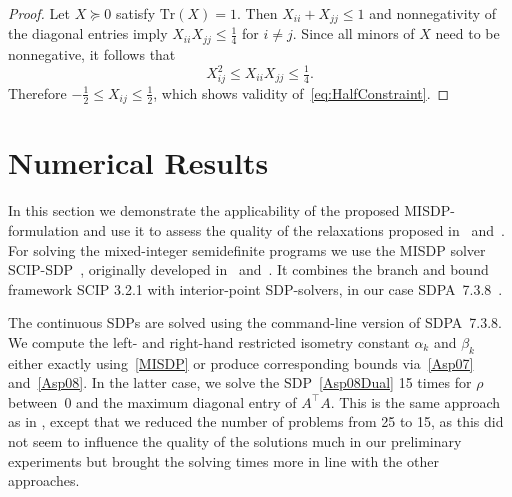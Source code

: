 \documentclass[journal]{IEEEtran}
\newcommand{\T}{^{\top}}
\newcommand{\Tr}{\text{Tr}}
\begin{document}
\begin{proof}
  Let $X \succeq 0$ satisfy $\Tr(X)=1$. Then $X_{ii}+X_{jj}\leq 1$ and
  nonnegativity of the diagonal entries imply $X_{ii}X_{jj}\leq
  \tfrac{1}{4}$ for $i \neq j$. Since all minors of $X$ need to be nonnegative, it
  follows that
  \begin{equation*}
    X_{ij}^2 \leq  X_{ii} X_{jj} \leq \tfrac{1}{4}.
  \end{equation*}
  Therefore $- \tfrac{1}{2} \leq X_{ij} \leq \tfrac{1}{2}$, which shows
  validity of~\eqref{eq:HalfConstraint}.
\end{proof}


\section{Numerical Results}
\label{sec:numerical_results}

\noindent
In this section we demonstrate the applicability of the proposed MISDP-formulation and use it to
assess the quality of the relaxations proposed in~\cite{Asp08} and~\cite{Asp07}.
For solving the mixed-integer semidefinite programs we use the MISDP solver SCIP-SDP~\cite{SCIP-SDP},
originally developed in~\cite{Mar13} and~\cite{MS12}. It combines the
branch and bound framework SCIP 3.2.1 \cite{SCIP} with 
interior-point SDP-solvers, in our case SDPA~7.3.8~\cite{SDPA6,SDPA7}.

The continuous SDPs are solved using the command-line version of
SDPA~7.3.8. We compute the left- and right-hand restricted isometry
constant $\alpha_k$ and $\beta_k$ either exactly using~\eqref{MISDP} or
produce corresponding bounds via~\eqref{Asp07} and~\eqref{Asp08}. In
the latter case, we solve the SDP~\eqref{Asp08Dual} 15 times for $\rho$ between~$0$ and the maximum
diagonal entry of $A\T A$. This is the same approach as in \cite{Asp08},
except that we reduced the number of problems from 25 to 15, as this did
not seem to influence the quality of the solutions much in our preliminary
experiments but brought the solving times more in line with the other
approaches.
\end{document}
